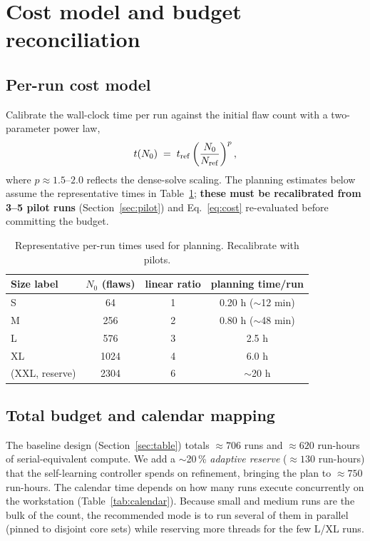 \documentclass[11pt]{article}
\begin{document}
\section{Cost model and budget reconciliation}
\label{sec:budget}

\subsection{Per-run cost model}

Calibrate the wall-clock time per run against the initial flaw count with a two-parameter
power law,
\begin{equation}
t(N_0) \;=\; t_{\rm ref}\left(\frac{N_0}{N_{\rm ref}}\right)^{p},
\label{eq:cost}
\end{equation}
where $p\approx 1.5$--$2.0$ reflects the dense-solve scaling. The planning estimates
below assume the representative times in Table~\ref{tab:times}; \textbf{these must be
recalibrated from 3--5 pilot runs} (Section~\ref{sec:pilot}) and Eq.~\eqref{eq:cost}
re-evaluated before committing the budget.

\begin{table}[h]
\centering
\small
\renewcommand{\arraystretch}{1.2}
\begin{tabular}{lccc}
\toprule
Size label & $N_0$ (flaws) & linear ratio & planning time/run \\
\midrule
S  & 64   & 1 & 0.20 h ($\sim$12 min) \\
M  & 256  & 2 & 0.80 h ($\sim$48 min) \\
L  & 576  & 3 & 2.5 h \\
XL & 1024 & 4 & 6.0 h \\
(XXL, reserve) & 2304 & 6 & $\sim$20 h \\
\bottomrule
\end{tabular}
\caption{Representative per-run times used for planning. Recalibrate with pilots.}
\label{tab:times}
\end{table}

\subsection{Total budget and calendar mapping}

The baseline design (Section~\ref{sec:table}) totals $\approx 706$ runs and
$\approx 620$ run-hours of serial-equivalent compute. We add a $\sim$20\,\%
\emph{adaptive reserve} ($\approx 130$ run-hours) that the self-learning controller
spends on refinement, bringing the plan to $\approx 750$ run-hours. The calendar time
depends on how many runs execute concurrently on the workstation
(Table~\ref{tab:calendar}). Because small and medium runs are the bulk of the count,
the recommended mode is to run several of them in parallel (pinned to disjoint core
sets) while reserving more threads for the few L/XL runs.
\end{document}
